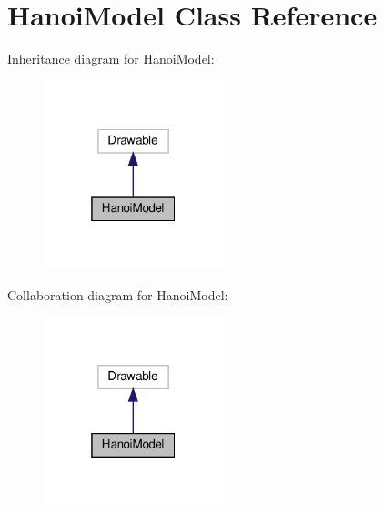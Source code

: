 \hypertarget{class_hanoi_model}{}\section{Hanoi\+Model Class Reference}
\label{class_hanoi_model}


Inheritance diagram for Hanoi\+Model\+:
\nopagebreak
\begin{figure}[H]
\begin{center}
\leavevmode
\includegraphics[width=148pt]{class_hanoi_model__inherit__graph}
\end{center}
\end{figure}


Collaboration diagram for Hanoi\+Model\+:
\nopagebreak
\begin{figure}[H]
\begin{center}
\leavevmode
\includegraphics[width=148pt]{class_hanoi_model__coll__graph}
\end{center}
\end{figure}
